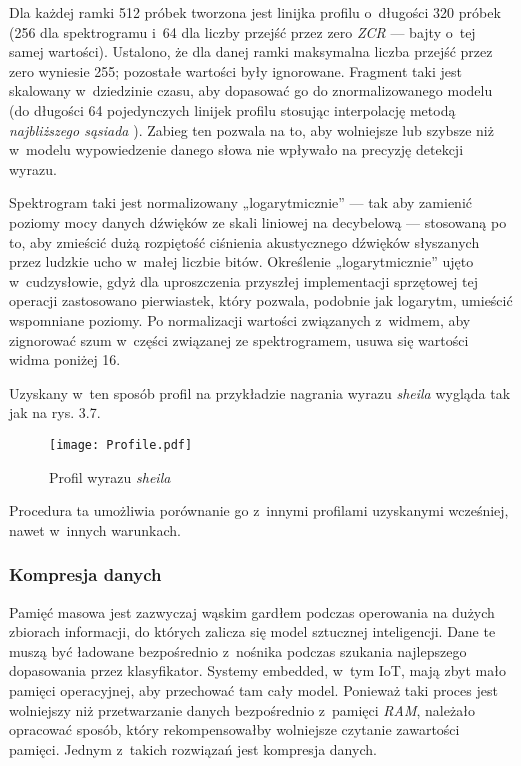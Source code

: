 Dla każdej ramki 512 próbek tworzona jest linijka profilu o~długości 320 próbek (256 dla spektrogramu i~64 dla liczby przejść przez zero \textit{ZCR} — bajty o~tej samej wartości). Ustalono, że dla danej ramki maksymalna liczba przejść przez zero wyniesie 255; pozostałe wartości były ignorowane. Fragment taki jest skalowany w~dziedzinie czasu, aby dopasować go do znormalizowanego modelu (do długości 64 pojedynczych linijek profilu stosując interpolację metodą \textit{najbliższego sąsiada} \cite{Skalowanie}). Zabieg ten pozwala na to, aby wolniejsze lub szybsze niż w~modelu wypowiedzenie danego słowa nie wpływało na precyzję detekcji wyrazu.

Spektrogram taki jest normalizowany „logarytmicznie” — tak aby zamienić poziomy mocy danych dźwięków ze skali liniowej na decybelową — stosowaną po to, aby zmieścić dużą rozpiętość ciśnienia akustycznego dźwięków słyszanych przez ludzkie ucho \cite{Sound} w~małej liczbie bitów. Określenie „logarytmicznie” ujęto w~cudzysłowie, gdyż dla uproszczenia przyszłej implementacji sprzętowej tej operacji zastosowano pierwiastek, który pozwala, podobnie jak logarytm, umieścić wspomniane poziomy. Po normalizacji wartości związanych z~widmem, aby zignorować szum w~części związanej ze spektrogramem, usuwa się wartości widma poniżej 16.

Uzyskany w~ten sposób profil na przykładzie nagrania wyrazu \textit{sheila} wygląda tak jak na rys. 3.7.

\begin{figure}[h]
	\centering
	\texttt{[image: Profile.pdf]}
	\caption{Profil wyrazu \textit{sheila}}
\end{figure}
\FloatBarrier %

Procedura ta umożliwia porównanie go z~innymi profilami uzyskanymi wcześniej, nawet w~innych warunkach.

\subsubsection{Kompresja danych}

Pamięć masowa jest zazwyczaj wąskim gardłem podczas operowania na dużych zbiorach informacji, do których zalicza się model sztucznej inteligencji. Dane te muszą być ładowane bezpośrednio z~nośnika podczas szukania najlepszego dopasowania przez klasyfikator. Systemy embedded, w~tym IoT, mają zbyt mało pamięci operacyjnej, aby przechować tam cały model. Ponieważ taki proces jest wolniejszy niż przetwarzanie danych bezpośrednio z~pamięci \textit{RAM}, należało opracować sposób, który rekompensowałby wolniejsze czytanie zawartości pamięci. Jednym z~takich rozwiązań jest kompresja danych.

